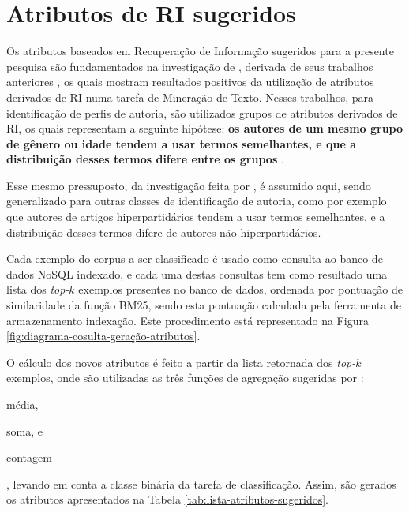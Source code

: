  



\section{Atributos de RI sugeridos}  \label{sec:Atributos-de-RI-sugeridos}
    Os atributos baseados em Recuperação de Informação sugeridos para a presente pesquisa são fundamentados na investigação de , derivada de seus trabalhos anteriores \cite{WEREN_CLEF_2014,WEREN_ARTIGO_2014}, os quais mostram resultados positivos da utilização de atributos derivados de RI numa tarefa de Mineração de Texto.
    Nesses trabalhos, para identificação de perfis de autoria, são utilizados grupos de atributos derivados de RI, os quais representam a seguinte hipótese: \textbf{os autores de um mesmo grupo de gênero ou idade tendem a usar termos semelhantes, e que a distribuição desses termos difere entre os grupos} \cite[p.~20]{WEREN_MESTRADO_2014}.
    
    Esse mesmo pressuposto, da investigação feita por , é assumido aqui, sendo generalizado para outras classes de identificação de autoria, como por exemplo que autores de artigos hiperpartidários tendem a usar termos semelhantes, e a distribuição desses termos difere de autores não hiperpartidários.
    
    
    
    Cada exemplo do corpus a ser classificado é usado como consulta ao banco de dados NoSQL indexado, e cada uma destas consultas tem como resultado uma lista dos \textit{top-$k$} exemplos presentes no banco de dados, ordenada por pontuação de similaridade da função BM25, sendo esta pontuação calculada pela ferramenta de armazenamento indexação. 
    Este procedimento está representado na Figura \ref{fig:diagrama-cosulta-geração-atributos}.
    
    O cálculo dos novos atributos é feito a partir da lista retornada dos \textit{top-$k$} exemplos, onde são utilizadas as três funções de agregação sugeridas por :
    \begin{enumerate*}[label=(\alph*)]
        \item média,
        \item soma, e
        \item contagem
    \end{enumerate*}, 
    levando em conta a classe binária da tarefa de classificação. 
    Assim, são gerados os atributos apresentados na Tabela \ref{tab:lista-atributos-sugeridos}.
    
